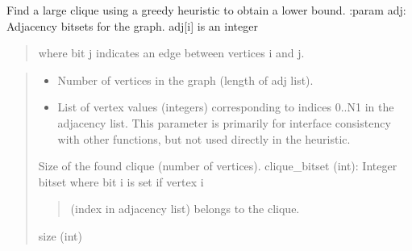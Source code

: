 \documentclass[letterpaper,10pt,english]{sphinxmanual}
\begin{document}

\begin{fulllineitems}
\label{\detokenize{index:hammindist.functions.greedy_initial_clique}}
\pysigstartsignatures
\pysiglinewithargsret
{}
{\sphinxparamcomma {}\sphinxparamcomma {}}
{}
\pysigstopsignatures
\sphinxAtStartPar
Find a large clique using a greedy heuristic to obtain a lower bound.
:param adj: Adjacency bitsets for the graph. adj{[}i{]} is an integer
\begin{quote}

\sphinxAtStartPar
where bit j indicates an edge between vertices i and j.
\end{quote}
\begin{quote}\begin{description}
\begin{itemize}
\item {} 
\sphinxAtStartPar
{} \textendash{} Number of vertices in the graph (length of adj list).

\item {} 
\sphinxAtStartPar
{} \textendash{} List of vertex values (integers) corresponding
to indices 0..N\sphinxhyphen{}1 in the adjacency list. This
parameter is primarily for interface consistency
with other functions, but not used directly in
the heuristic.

\end{itemize}

\sphinxAtStartPar

\sphinxAtStartPar
Size of the found clique (number of vertices).
clique\_bitset (int): Integer bitset where bit i is set if vertex i
\begin{quote}

\sphinxAtStartPar
(index in adjacency list) belongs to the clique.
\end{quote}


\sphinxAtStartPar
size (int)

\end{description}\end{quote}

\end{fulllineitems}
\end{document}
